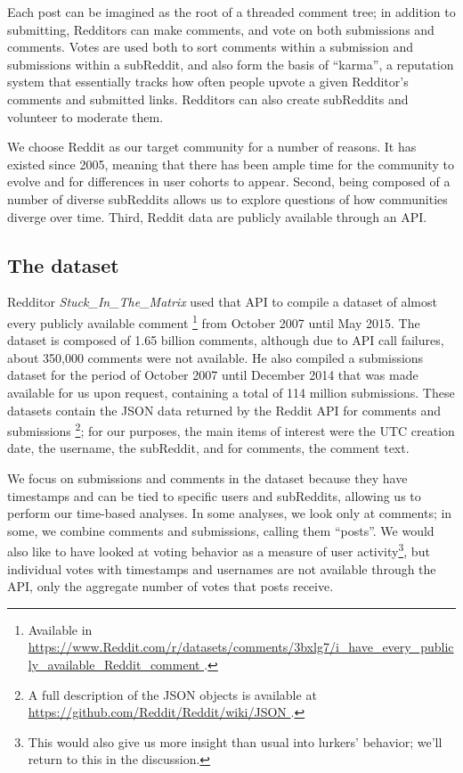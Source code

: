 Each post can be imagined as the root of a threaded comment tree; in addition to submitting, Redditors can make comments, and vote on both submissions and comments.  Votes are used both to sort comments within a submission and submissions within a subReddit, and also form the basis of ``karma'', a reputation system that essentially tracks how often people upvote a given Redditor's comments and submitted links.  Redditors can also create subReddits and volunteer to moderate them.

We choose Reddit as our target community for a number of reasons.  It has existed since 2005, meaning that there has been ample time for the community to evolve and for differences in user cohorts to appear.  Second, being composed of a number of diverse subReddits allows us to explore questions of how communities diverge over time.  Third, Reddit data are publicly available through an API.

\subsection{The dataset}

Redditor \textit{Stuck\_In\_The\_Matrix} used that API to compile a dataset of almost every publicly available comment \footnote{Available in \url{https://www.Reddit.com/r/datasets/comments/3bxlg7/i_have_every_publicly_available_Reddit_comment }.} from October 2007 until May 2015.  The dataset is composed of 1.65 billion comments, although due to API call failures, about 350,000 comments were not available.  He also compiled a submissions dataset for the period of October 2007 until December 2014 that was made available for us upon request, containing a total of 114 million submissions.  These datasets contain the JSON data returned by the Reddit API for comments and submissions \footnote{A full description of the JSON objects is available at \url{https://github.com/Reddit/Reddit/wiki/JSON }.}; for our purposes, the main items of interest were the UTC creation date, the username, the subReddit, and for comments, the comment text.

We focus on submissions and comments in the dataset because they have timestamps and can be tied to specific users and subReddits, allowing us to perform our time-based analyses.   In some analyses, we look only at comments; in some, we combine comments and submissions, calling them ``posts''.  We would also like to have looked at voting behavior as a measure of user activity\footnote{This would also give us more insight than usual into lurkers' behavior; we'll return to this in the discussion.}, but individual votes with timestamps and usernames are not available through the API, only the aggregate number of votes that posts receive.

